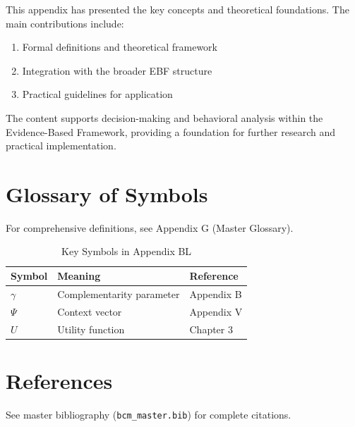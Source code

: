 This appendix has presented the key concepts and theoretical foundations.
The main contributions include:

\begin{enumerate}
    \item Formal definitions and theoretical framework
    \item Integration with the broader EBF structure
    \item Practical guidelines for application
\end{enumerate}

The content supports decision-making and behavioral analysis within the
Evidence-Based Framework, providing a foundation for further research
and practical implementation.


\section{Glossary of Symbols}
\label{sec:bl-glossary}

For comprehensive definitions, see Appendix G (Master Glossary).

\begin{table}[htbp]
\centering
\caption{Key Symbols in Appendix BL}
\begin{tabular}{lll}
\toprule
\textbf{Symbol} & \textbf{Meaning} & \textbf{Reference} \\
\midrule
$\gamma$ & Complementarity parameter & Appendix B \\
$\Psi$ & Context vector & Appendix V \\
$U$ & Utility function & Chapter 3 \\
\bottomrule
\end{tabular}
\end{table}


\section{References}
\label{sec:references}

See master bibliography (\texttt{bcm\_master.bib}) for complete citations.

\nocite{bcm_master}

